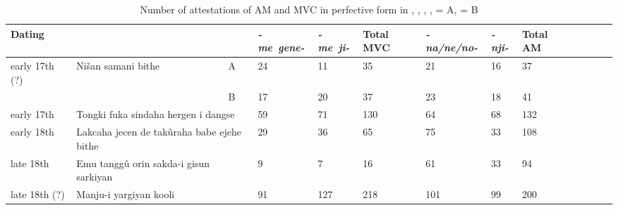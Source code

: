 \documentclass{article}
\newcommand{\ipa}[1]{\textit{{\phon\mbox{#1}}}} %
\newcommand{\ofwh}{}%
\newcommand{\plus}[1]{#1}
\begin{document}
 \begin{landscape}
 \begin{table}[h]
\caption{Number of attestations of AM and MVC in perfective form in
\citet{kanda55tongki}, \citet{shunjuu64tulishen}, \citet{shunjuu92yargiyan}, \citet{stary83sakda}, \citet{nowak77nisan} = A, \citet{jaxontov93nisan} = B} \centering \label{tab:evolution}
 \begin{tabular}{lllllllllllll}
 \toprule
Dating &	 &	 &	\ipa{-me gene-} &	\ipa{-me ji-} &	Total MVC&	\ipa{-na/ne/no-} &	\ipa{-nji-} &	Total AM&	\\	
\midrule
early 17th (?) &\footnotesize 	Nišan samani  \plus{bithe}&	A &	24 &	11 &	35&	21 \ofwh &	16 \ofwh  &	37&	\\
 &	  &	B &	17 &	20 &	37&	23 \ofwh  &	18 \ofwh  &	41&	\\	
early 17th &	\multicolumn{2}{l}{\footnotesize Tongki fuka sindaha \plus{hergen i dangse}}	 &	59 &	71 \ofwh   &130	&	64 \ofwh  &	68 \ofwh  &	132&	\\	
\midrule
early 18th &	 \multicolumn{2}{l}{\footnotesize Lakcaha jecen de \plus{takûraha babe ejehe bithe}}  &	 	29 \ofwh &	36 \ofwh  &	65&	75 \ofwh &	33 \ofwh &	108&	\\	
late 18th &	\multicolumn{2}{l}{\footnotesize Emu tanggû orin sakda-i \plus{gisun sarkiyan}}	 &	9 &	7 &16	&	61 \ofwh &	33 \ofwh &	94&	\\	
\midrule
late 18th (?) &	\multicolumn{2}{l}{\footnotesize  Manju-i yargiyan kooli} 	 &	91 &	127 &218	&	101 \ofwh &	99 \ofwh &200	&	\\	
\bottomrule
\end{tabular}
\end{table}
\end{landscape}  
\end{document}
